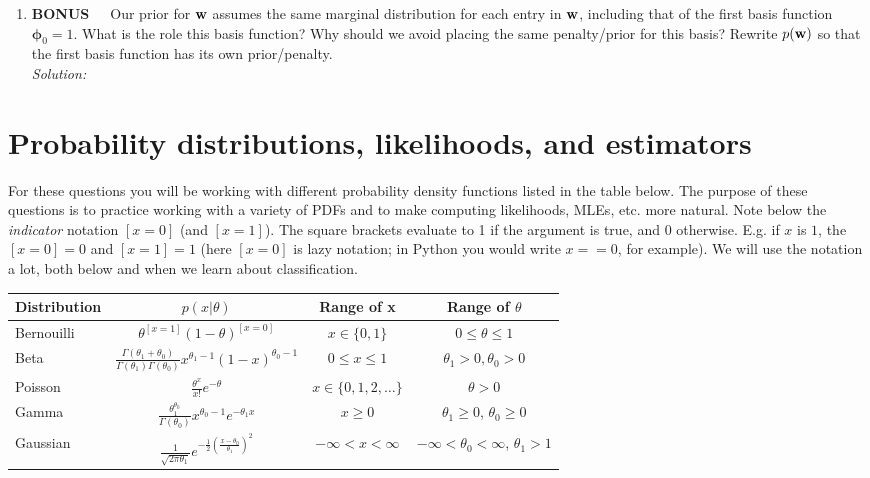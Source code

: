 \documentclass[12pt,a4paper]{article}
\newcommand{\lp}{\left(}
\newcommand{\rp}{\right)}
\newcommand{\wscalar}{w}
\newcommand{\wvec}{{\bf \wscalar}}
\newcommand{\phivec}{\boldsymbol{\phi}}
\begin{document}
\begin{enumerate}
  \item {\bf BONUS}~~~Our prior for $\wvec$ assumes the same marginal distribution for each entry in $\wvec$, including that of the first basis function $\phivec_0 = 1$.  What is the role this basis function?  Why should we avoid placing the same penalty/prior for this basis?  Rewrite $p(\wvec)$ so that the first basis function has its own prior/penalty. \\
	  \emph{Solution:} \\
  
\end{enumerate}

\vspace{0.25in}
\section{Probability distributions, likelihoods, and estimators}
For these questions you will be working with different probability density functions listed in the table below.  The purpose of these questions is to practice working with a variety of PDFs and to make computing likelihoods, MLEs, etc. more natural. Note below the {\em indicator} notation $[x=0]$ (and $[x=1]$).  The square brackets evaluate to 1 if the argument is true, and 0 otherwise.  E.g. if $x$ is $1$, the $[x=0] = 0$ and $[x=1] = 1$ (here $[x=0]$ is lazy notation; in Python you would write $x==0$, for example).  We will use the notation a lot, both below and when we learn about classification.
%
\begin{table}[h!]
  \centering
\begin{tabular}{|l|c|c|c|}
  \hline
  Distribution & $p(x | \theta )$ &   Range of x & Range of $\theta$ \\ \hline\hline
  Bernouilli & $\theta^{[x=1]}(1-\theta)^{[x=0]}$ & $x \in \{0,1\}$ & $0 \leq \theta \leq 1$ \\\hline
  Beta & $\frac{\Gamma\lp\theta_1+\theta_0\rp}{\Gamma\lp\theta_1\rp\Gamma\lp\theta_0\rp} x^{\theta_1-1}(1-x)^{\theta_0-1}$ & $0 \leq x \leq 1$ & $\theta_1 > 0, \theta_0 > 0$ \\ \hline
  Poisson & $\frac{\theta^x}{x!}e^{-\theta}$& $x \in \{0,1,2,\ldots\}$ & $\theta > 0$ \\ \hline
  Gamma & $\frac{\theta_1^{\theta_0}}{\Gamma\lp\theta_0\rp} x^{\theta_0-1}e^{-\theta_1 x}$& $x \geq 0$ & $\theta_1 \geq 0$, $\theta_0 \geq 0$ \\ \hline
  Gaussian & $\frac{1}{\sqrt{2\pi\theta_1}} e^{-\frac{1}{2}\lp \frac{x-\theta_0}{\theta_1}\rp^2}$ & $-\infty < x < \infty$ &  $-\infty < \theta_0 < \infty$,  $\theta_1>1$  \\ \hline
\end{tabular}
\end{table}
\end{document}
